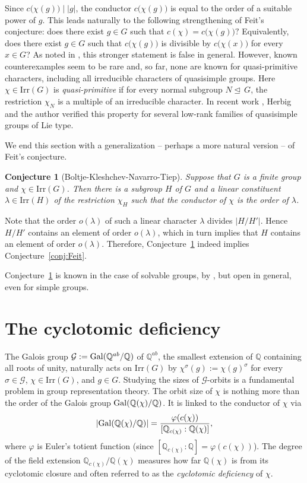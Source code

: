 \documentclass[12pt]{amsart}
\newtheorem{conjecture}[theorem]{Conjecture}
\theoremstyle{definition}
\numberwithin{equation}{section}
\newcommand{\Irr}{{\mathrm {Irr}}}
\newcommand{\Gal}{{\rm Gal}}
\newcommand{\QQ}{{\mathbb Q}}
\def\nor{\trianglelefteq\,}
\begin{document}
Since \(c\bigl(\chi(g)\bigr)\mid |g|\), the conductor
\(c\bigl(\chi(g)\bigr)\) is equal to the order of a suitable power
of \(g\). This leads naturally to the following strengthening of
Feit's conjecture: does there exist \(g\in G\) such that $
c(\chi)=c\bigl(\chi(g)\bigr)? $ Equivalently, does there exist
\(g\in G\) such that $ c\bigl(\chi(g)\bigr) $ is divisible by
\(c\bigl(\chi(x)\bigr)\) for every \(x\in G\)? As noted in
\cite[\S9]{BKNT24}, this stronger statement is false in general.
However, known counterexamples seem to be rare and, so far, none are
known for quasi-primitive characters, including all irreducible
characters of quasisimple groups. Here $\chi\in\Irr(G)$ is
\emph{quasi-primitive} if for every normal subgroup $N\nor G$, the
restriction $\chi_N$ is a multiple of an irreducible character. In
recent work \cite{HH26}, Herbig and the author verified this
property for several low-rank families of quasisimple groups of Lie
type.


We end this section with a generalization -- perhaps a more natural
version -- of Feit's conjecture.

\begin{conjecture}[Boltje-Kleshchev-Navarro-Tiep]\label{conj:aaa}
Suppose that $G$ is a finite group and $\chi\in \Irr(G)$. Then there
is a subgroup $H$ of $G$ and a linear constituent $\lambda\in
\Irr(H)$ of the restriction $\chi_H$ such that the conductor of
$\chi$ is the order of $\lambda$.
\end{conjecture}

Note that the order $o(\lambda)$ of such a linear character
$\lambda$ divides $|H/H'|$. Hence $H/H'$ contains an element of
order $o(\lambda)$, which in turn implies that $H$ contains an
element of order $o(\lambda)$. Therefore, Conjecture~\ref{conj:aaa}
indeed implies Conjecture~\ref{conj:Feit}.

Conjecture~\ref{conj:aaa} is known in the case of solvable groups,
by \cite[Theorem~9.4]{BKNT24}, but open in general, even for simple
groups.


\section{The cyclotomic deficiency}\label{sec:cyclotomic-deficiency}

The Galois group $\mathcal{G}:=\Gal(\QQ^{ab}/\QQ)$ of $\QQ^{ab}$,
the smallest extension of $\QQ$ containing all roots of unity,
naturally acts on $\Irr(G)$ by $\chi^\sigma(g):=\chi(g)^\sigma$ for
every $\sigma\in \mathcal{G}$, $\chi\in\Irr(G)$, and $g\in G$.
Studying the sizes of $\mathcal{G}$-orbits is a fundamental problem
in group representation theory. The orbit size of $\chi$ is nothing
more than the order of the Galois group $\Gal(\QQ(\chi)/\QQ)$. It is
linked to the conductor of $\chi$ via
\[
|\Gal(\QQ(\chi)/\QQ)|=\frac{\varphi(c(\chi))}{[\QQ_{c(\chi)}:\QQ(\chi)]},
\]
where $\varphi$ is Euler's totient function (since
$[\QQ_{c(\chi)}:\QQ]=\varphi(c(\chi))$). The degree of the field
extension $\QQ_{c(\chi)}/\QQ(\chi)$ measures how far $\QQ(\chi)$ is
from its cyclotomic closure and often referred to as the
\emph{cyclotomic deficiency} of $\chi$.
\end{document}
